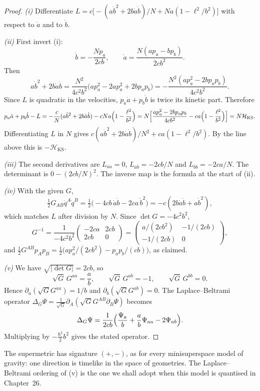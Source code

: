 \begin{proof}
\emph{(i)} Differentiate $L=c\bigl[-(a\dot b^2+2b\dot a\dot b)/N+Na(1-\ell^2/b^2)\bigr]$ with respect to $\dot a$ and to $\dot b$.

\emph{(ii)} First invert (i):
\[
\dot b=-\frac{Np_a}{2cb},\qquad\dot a=\frac{N(ap_a-bp_b)}{2cb^2}.
\]
Then
\[
a\dot b^2+2b\dot a\dot b=\frac{N^2}{4c^2b^2}\bigl(ap_a^2-2ap_a^2+2bp_ap_b\bigr)=-\frac{N^2(ap_a^2-2bp_ap_b)}{4c^2b^2}.
\]
Since $L$ is quadratic in the velocities, $p_a\dot a+p_b\dot b$ is twice its kinetic part. Therefore
\[
p_a\dot a+p_b\dot b-L=-\frac cN(a\dot b^2+2b\dot a\dot b)-cNa\Bigl(1-\frac{\ell^2}{b^2}\Bigr)
=N\Bigl[\frac{ap_a^2-2bp_ap_b}{4cb^2}-ca\Bigl(1-\frac{\ell^2}{b^2}\Bigr)\Bigr]=N\mathcal H_{\mathrm{KS}} .
\]
Differentiating $L$ in $N$ gives $c(a\dot b^2+2b\dot a\dot b)/N^2+ca(1-\ell^2/b^2)$. By the line above this is $-\mathcal H_{\mathrm{KS}}$.

\emph{(iii)} The second derivatives are $L_{\dot a\dot a}=0$, $L_{\dot a\dot b}=-2cb/N$ and $L_{\dot b\dot b}=-2ca/N$. The determinant is $0-(2cb/N)^2$. The inverse map is the formula at the start of (ii).

\emph{(iv)} With the given $G$,
\[
\tfrac12G_{AB}\dot q^A\dot q^B=\tfrac12\bigl(-4cb\,\dot a\dot b-2ca\,\dot b^2\bigr)=-c(2b\dot a\dot b+a\dot b^2),
\]
which matches $L$ after division by $N$. Since $\det G=-4c^2b^2$,
\[
G^{-1}=\frac1{-4c^2b^2}\begin{pmatrix}-2ca&2cb\\2cb&0\end{pmatrix}=\begin{pmatrix}a/(2cb^2)&-1/(2cb)\\-1/(2cb)&0\end{pmatrix},
\]
and $\frac12G^{AB}p_Ap_B=\frac12\bigl(ap_a^2/(2cb^2)-p_ap_b/(cb)\bigr)$, as claimed.

\emph{(v)} We have $\sqrt{|\det G|}=2cb$, so
\[
\sqrt G\,G^{aa}=\frac ab,\qquad\sqrt G\,G^{ab}=-1,\qquad\sqrt G\,G^{bb}=0 .
\]
Hence $\partial_a(\sqrt GG^{aa})=1/b$ and $\partial_b(\sqrt GG^{ab})=0$. The Laplace--Beltrami operator $\Delta_G\Psi=\frac1{\sqrt G}\partial_A(\sqrt GG^{AB}\partial_B\Psi)$ becomes
\[
\Delta_G\Psi=\frac1{2cb}\Bigl(\frac{\Psi_a}b+\frac ab\Psi_{aa}-2\Psi_{ab}\Bigr).
\]
Multiplying by $-\frac{\hbar^2}2b^2$ gives the stated operator.
\end{proof}


The supermetric has signature $(+,-)$, as for every minisuperspace model of gravity: one direction is timelike in the space of geometries. The Laplace--Beltrami ordering of (v) is the one we shall adopt when this model is quantised in Chapter~26.

